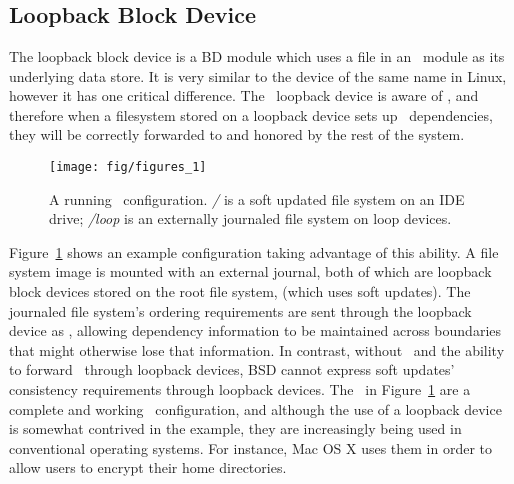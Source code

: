 \section{\Modules}
\label{sec:modules}

\begin{comment}
This section describes several \Kudos\ \modules\ which contribute significantly
to the overall functionality of \Kudos, or which demonstrate unique or
important capabilities of \chdescs\ and the \module\ system. The journal
\module\ has already been described (in \S\ref{sec:using:journal}), while
others like the write-through cache, partitioner, and memory block device, have
functions which are fairly obvious from their names and need no further
description.
\end{comment}






\subsection{Loopback Block Device}
\label{sec:modules:loop}

The loopback block device is a BD module which uses a file in an \LFS\ module as
its underlying data store. It is very similar to the device of the same name in
Linux, however it has one critical difference. The \Kudos\ loopback device is
aware of \chdescs, and therefore when a filesystem stored on a loopback device
sets up \chdesc\ dependencies, they will be correctly forwarded to and honored
by the rest of the system.

\begin{figure}[htb]
  \centering
  \texttt{[image: fig/figures\_1]}
  \caption{A running \Kudos\ configuration. {\it/} is a soft updated
    file system on an IDE drive; {\it/loop} is an externally journaled
    file system on loop devices.}
  \label{fig:kfs-graph}
\end{figure}

Figure~\ref{fig:kfs-graph} shows an example configuration taking advantage of
this ability. A file system image is mounted with an external journal, both of
which are loopback block devices stored on the root file system, (which uses
soft updates). The journaled file system's ordering requirements are sent
through the loopback device as \chdescs, allowing dependency information to be
maintained across boundaries that might otherwise lose that information. In
contrast, without \chdescs\ and the ability to forward \chdescs\ through
loopback devices, BSD cannot express soft updates' consistency requirements
through loopback devices. The \modules\ in Figure~\ref{fig:kfs-graph} are a
complete and working \Kudos\ configuration, and although the use of a loopback
device is somewhat contrived in the example, they are increasingly being used in
conventional operating systems. For instance, Mac OS X uses them in order to
allow users to encrypt their home directories.

